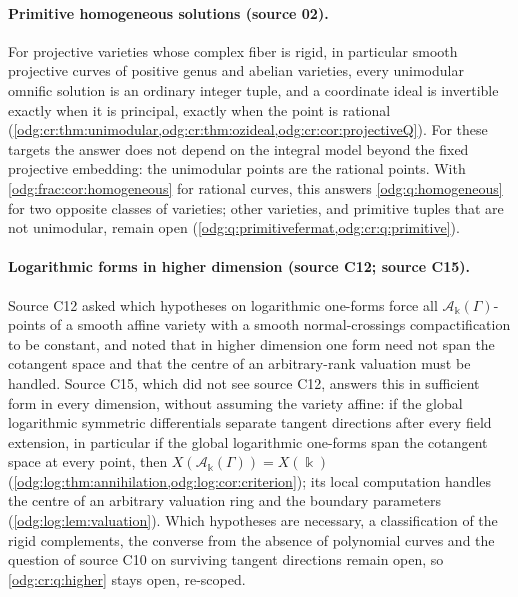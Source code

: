 \documentclass[11pt,oneside]{article}
\numberwithin{equation}{section}
\theoremstyle{definition}
\theoremstyle{remark}
\newcommand{\crA}{\mathcal A_\Bbbk(\Gamma)}
\begin{document}
\paragraph{Primitive homogeneous solutions (source 02).} For projective varieties
whose complex fiber is rigid, in particular smooth projective curves of positive
genus and abelian varieties, every unimodular omnific solution is an ordinary integer
tuple, and a coordinate ideal is invertible exactly when it is principal, exactly
when the point is rational (\cref{odg:cr:thm:unimodular,odg:cr:thm:ozideal,odg:cr:cor:projectiveQ}).
For these targets the answer does not depend on the integral model beyond the fixed
projective embedding: the unimodular points are the rational points. With
\cref{odg:frac:cor:homogeneous} for rational curves, this answers
\cref{odg:q:homogeneous} for two opposite classes of varieties; other varieties, and
primitive tuples that are not unimodular, remain open
(\cref{odg:q:primitivefermat,odg:cr:q:primitive}).

\paragraph{Logarithmic forms in higher dimension (source C12; source C15).} Source C12
asked which hypotheses on logarithmic one-forms force all $\crA$-points of a smooth
affine variety with a smooth normal-crossings compactification to be constant, and noted
that in higher dimension one form need not span the cotangent space and that the centre
of an arbitrary-rank valuation must be handled. Source C15, which did not see source
C12, answers this in sufficient form in every dimension, without assuming the variety
affine: if the global logarithmic symmetric differentials separate tangent directions
after every field extension, in particular if the global logarithmic one-forms span the
cotangent space at every point, then $X(\crA)=X(\Bbbk)$
(\cref{odg:log:thm:annihilation,odg:log:cor:criterion}); its local computation handles
the centre of an arbitrary valuation ring and the boundary parameters
(\cref{odg:log:lem:valuation}). Which hypotheses are necessary, a classification of the
rigid complements, the converse from the absence of polynomial curves and the question of
source C10 on surviving tangent directions remain open, so \cref{odg:cr:q:higher} stays
open, re-scoped.
\end{document}

